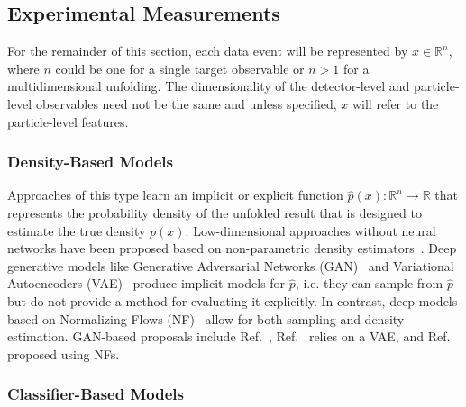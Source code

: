\documentclass[a4paper,11pt]{article}
\begin{document}
\subsection{Experimental Measurements}

For the remainder of this section, each data event will be represented by $x\in\mathbb{R}^n$, where $n$ could be one for a single target observable or $n>1$ for a multidimensional unfolding.  The dimensionality of the detector-level and particle-level observables need not be the same and unless specified, $x$ will refer to the particle-level features.

\subsubsection{Density-Based Models}
\label{sec:density}


Approaches of this type learn an implicit or explicit function $\hat{p}(x):\mathbb{R}^n\rightarrow\mathbb{R}$ that represents the probability density of the unfolded result that is designed to estimate the true density $p(x)$.  Low-dimensional approaches without neural networks have been proposed based on non-parametric density estimators~\cite{Dembinski:2013hdz}. 
 Deep generative models like Generative Adversarial Networks (GAN)~\cite{Goodfellow:2014:GAN:2969033.2969125,Creswell2018} and Variational Autoencoders (VAE)~\cite{kingma2014autoencoding,Kingma2019} produce implicit models for $\hat{p}$, i.e. they can sample from $\hat{p}$ but do not provide a method for evaluating it explicitly.  In contrast, deep models based on Normalizing Flows (NF)~\cite{10.5555/3045118.3045281,Kobyzev2020} allow for both sampling and density estimation.  GAN-based proposals include Ref.~\cite{Datta:2018mwd,Bellagente:2019uyp}, Ref.~\cite{Howard:2021pos} relies on a VAE, and Ref.~\cite{Bellagente:2020piv,Vandegar:2020yvw} proposed using NFs.

\subsubsection{Classifier-Based Models}
\label{sec:classifier}
\end{document}
